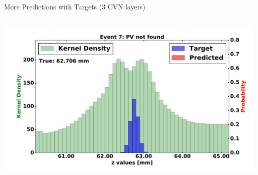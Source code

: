 \begin{frame}{More Predictions with Targets (3 CVN layers)}
\begin{columns}[c]
\begin{center}
           \includegraphics[width=1\textwidth, height=0.45\textwidth, trim=18 0 18 0]{images/120000_3layer_43.pdf}
       \end{center}
  \end{columns}
\end{frame}

